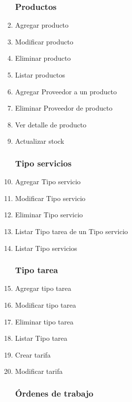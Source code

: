 \documentclass[12pt]{extarticle}
\begin{document}
\begin{spacing}{1.2}
\begin{multicols}{2}
\begin{enumerate}
        \subsubsection*{Productos}
            \item Agregar producto
            \item Modificar producto
            \item Eliminar producto
            \item Listar productos
            \item Agregar Proveedor a un producto
            \item Eliminar Proveedor de producto
            \item Ver detalle de producto
            \item Actualizar stock
        \subsubsection*{Tipo servicios}
            \item Agregar Tipo servicio
            \item Modificar Tipo servicio
            \item Eliminar Tipo servicio
            \item Listar Tipo tarea de un Tipo servicio
            \item Listar Tipo servicios
        \subsubsection*{Tipo tarea}
            \item Agregar tipo tarea
            \item Modificar tipo tarea
            \item Eliminar tipo tarea
            \item Listar Tipo tarea
            \item Crear tarifa
            \item Modificar tarifa
        \subsubsection*{Órdenes de trabajo}



\end{enumerate}
\end{multicols}
\end{spacing}
\end{document}
